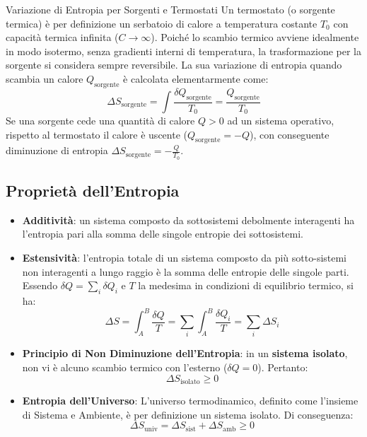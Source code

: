 \begin{definizione}{Variazione di Entropia per Sorgenti e Termostati}
Un termostato (o sorgente termica) è per definizione un serbatoio di calore a temperatura costante $T_0$ con capacità termica infinita ($C \to \infty$). Poiché lo scambio termico avviene idealmente in modo isotermo, senza gradienti interni di temperatura, la trasformazione per la sorgente si considera sempre reversibile. La sua variazione di entropia quando scambia un calore $Q_{\text{sorgente}}$ è calcolata elementarmente come:
\begin{equation}
    \boxed{ \Delta S_{\text{sorgente}} = \int \frac{\delta Q_{\text{sorgente}}}{T_0} = \frac{Q_{\text{sorgente}}}{T_0} }
\end{equation}
Se una sorgente cede una quantità di calore $Q > 0$ ad un sistema operativo, rispetto al termostato il calore è uscente ($Q_{\text{sorgente}} = -Q$), con conseguente diminuzione di entropia $\Delta S_{\text{sorgente}} = -\frac{Q}{T_0}$.
\end{definizione}

\subsection{Proprietà dell'Entropia}
\begin{itemize}
    \item \textbf{Additività}: un sistema composto da sottosistemi debolmente interagenti ha l'entropia pari alla somma delle singole entropie dei sottosistemi.
    \item \textbf{Estensività}: l'entropia totale di un sistema composto da più sotto-sistemi non interagenti a lungo raggio è la somma delle entropie delle singole parti. Essendo $\delta Q = \sum_i \delta Q_i$ e $T$ la medesima in condizioni di equilibrio termico, si ha:
    \begin{equation}
        \Delta S = \int_A^B \frac{\delta Q}{T} = \sum_i \int_A^B \frac{\delta Q_i}{T} = \sum_i \Delta S_i
    \end{equation}
    
    \item \textbf{Principio di Non Diminuzione dell'Entropia}: in un \textbf{sistema isolato}, non vi è alcuno scambio termico con l'esterno ($\delta Q = 0$). Pertanto:
    \begin{equation}
        \boxed{ \Delta S_{\text{isolato}} \ge 0 }
    \end{equation}
    
    \item \textbf{Entropia dell'Universo}: L'universo termodinamico, definito come l'insieme di Sistema e Ambiente, è per definizione un sistema isolato. Di conseguenza:
    \begin{equation*}
        \Delta S_{\text{univ}} = \Delta S_{\text{sist}} + \Delta S_{\text{amb}} \ge 0
    \end{equation*}
\end{itemize}

